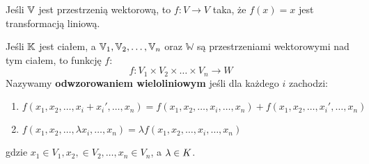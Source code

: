 \begin{example}
	Jeśli \(\mathbb{V}\) jest przestrzenią wektorową, to \(f: V \rightarrow V\) taka, że \(f(x) = x\) jest transformacją liniową.
\end{example}


\begin{definition}
	Jeśli \(\mathbb{K}\) jest ciałem, a \(\mathbb{V}_1, \mathbb{V}_2, \dots, \mathbb{V}_n\) oraz \(\mathbb{W}\) są przestrzeniami wektorowymi nad tym ciałem, to funkcję \(f\):
	\[
		f: V_1 \times V_2 \times \dots \times V_n \rightarrow W
	\]
	Nazywamy \textbf{odwzorowaniem wieloliniowym} jeśli dla każdego \(i\) zachodzi:

	\begin{enumerate}
		\item \( f(x_1, x_2, \dots, x_i + x_{i}', \dots, x_n) = f(x_1, x_2, \dots, x_i, \dots, x_n) + f(x_1, x_2, \dots, x_{i}', \dots, x_n) \)
		\item \( f(x_1, x_2, \dots, \lambda x_i, \dots, x_n) = \lambda f(x_1, x_2, \dots, x_i, \dots, x_n) \)
	\end{enumerate}

	gdzie \(x_1 \in V_1, x_2, \in V_2, \dots, x_n \in V_n\), a \(\lambda \in K\).
\end{definition}